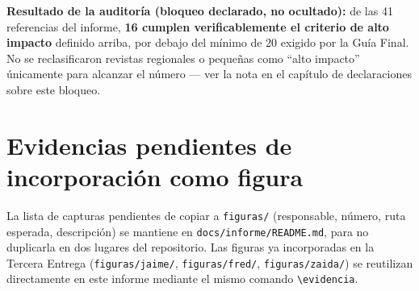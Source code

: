 \textbf{Resultado de la auditor\'ia (bloqueo declarado, no ocultado):} de
las 41 referencias del informe, \textbf{16 cumplen verificablemente el
criterio de alto impacto} definido arriba, por debajo del m\'inimo de 20
exigido por la Gu\'ia Final. No se reclasificaron revistas regionales o
peque\~nas como ``alto impacto'' \'unicamente para alcanzar el n\'umero
--- ver la nota en el cap\'itulo de declaraciones sobre este bloqueo.

\section{Evidencias pendientes de incorporaci\'on como figura}

La lista de capturas pendientes de copiar a \texttt{figuras/} (responsable,
n\'umero, ruta esperada, descripci\'on) se mantiene en
\texttt{docs/informe/README.md}, para no duplicarla en dos lugares del
repositorio. Las figuras ya incorporadas en la Tercera Entrega
(\texttt{figuras/jaime/}, \texttt{figuras/fred/}, \texttt{figuras/zaida/})
se reutilizan directamente en este informe mediante el mismo comando
\texttt{\textbackslash evidencia}.
